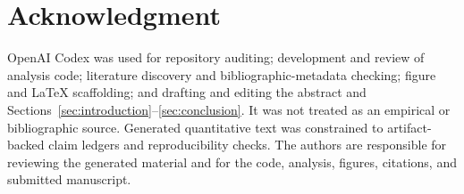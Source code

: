 \section*{Acknowledgment}

OpenAI Codex was used for repository auditing; development and review of
analysis code; literature discovery and bibliographic-metadata checking;
figure and LaTeX scaffolding; and drafting and editing the abstract and
Sections~\ref{sec:introduction}--\ref{sec:conclusion}.  It was not treated as an
empirical or bibliographic source.  Generated quantitative text was constrained
to artifact-backed claim ledgers and reproducibility checks.  The authors are
responsible for reviewing the generated material and for the code, analysis,
figures, citations, and submitted manuscript.
